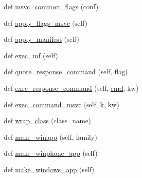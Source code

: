 \begin{DoxyCompactItemize}
\item 
def \hyperlink{namespacewaflib_1_1_tools_1_1msvc_a061b632c6b5d14ccc16c85a38478a66f}{msvc\+\_\+common\+\_\+flags} (conf)
\item 
def \hyperlink{namespacewaflib_1_1_tools_1_1msvc_afc3769991c03c5bd7ee6cc2750dfb438}{apply\+\_\+flags\+\_\+msvc} (self)
\item 
def \hyperlink{namespacewaflib_1_1_tools_1_1msvc_ab42908ff68ba51a419f4c36751d0535d}{apply\+\_\+manifest} (self)
\item 
def \hyperlink{namespacewaflib_1_1_tools_1_1msvc_a06fd303962ebc6664ef99c2171a4ea49}{exec\+\_\+mf} (self)
\item 
def \hyperlink{namespacewaflib_1_1_tools_1_1msvc_a3accf73dc1db52f81c6f170f2a552718}{quote\+\_\+response\+\_\+command} (self, flag)
\item 
def \hyperlink{namespacewaflib_1_1_tools_1_1msvc_a05f3fa5b6aaec55466b65420441a0649}{exec\+\_\+response\+\_\+command} (self, \hyperlink{sndfile__play_8m_adfc5ba7e22f5e4a6221c12a70503bef3}{cmd}, kw)
\item 
def \hyperlink{namespacewaflib_1_1_tools_1_1msvc_a3be3049317d31cd6bd6f292f58cdc5b5}{exec\+\_\+command\+\_\+msvc} (self, \hyperlink{rfft2d_test_m_l_8m_adc468c70fb574ebd07287b38d0d0676d}{k}, kw)
\item 
def \hyperlink{namespacewaflib_1_1_tools_1_1msvc_a9f4e48294a54177f979fd2859b38f9ab}{wrap\+\_\+class} (class\+\_\+name)
\item 
def \hyperlink{namespacewaflib_1_1_tools_1_1msvc_a742af4128566150a296d3a049856ab87}{make\+\_\+winapp} (self, family)
\item 
def \hyperlink{namespacewaflib_1_1_tools_1_1msvc_a6775cde1a9e529ef8ec67073ab4ac321}{make\+\_\+winphone\+\_\+app} (self)
\item 
def \hyperlink{namespacewaflib_1_1_tools_1_1msvc_aabfc9de92701f46cc9cf6580af3ec7b4}{make\+\_\+windows\+\_\+app} (self)
\end{DoxyCompactItemize}
